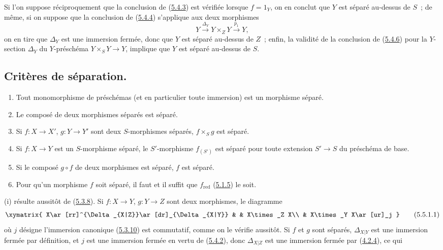 \begin{remark}[5.4.8]
\label{I.5.4.8-fr}
Si l'on suppose réciproquement que la conclusion de
(\hyperref[I.5.4.3-fr]{5.4.3}) est vérifiée lorsque $f=1_Y$, on en conclut
que $Y$ est séparé au-dessus de $S$~; de même, si on suppose que la conclusion
de (\hyperref[I.5.4.4-fr]{5.4.4}) s'applique aux deux morphismes
\[
  Y\xrightarrow{\Delta_Y}Y\times_Z Y\xrightarrow{p_1}Y,
\]
on en tire que $\Delta_Y$ est une immersion fermée, donc que $Y$ est séparé
au-dessus de $Z$~; enfin, la validité de la conclusion de
(\hyperref[I.5.4.6-fr]{5.4.6}) pour la $Y$-section $\Delta_Y$ du
$Y$-préschéma $Y\times_S Y\to Y$, implique que $Y$ est séparé au-dessus de
$S$.
\end{remark}

\subsection{Critères de séparation.}
\label{subsection:I.5.5-fr}

\begin{proposition}[5.5.1]
\label{I.5.5.1-fr}
\begin{enumerate}
  \item[\rm(i)] Tout monomorphisme de préschémas (et en particulier toute
    immersion) est un morphisme séparé.
  \item[\rm(ii)] Le composé de deux morphismes séparés est séparé.
  \item[\rm(iii)] Si $f:X\to X'$, $g:Y\to Y'$ sont deux $S$-morphismes
    séparés, $f\times_S g$ est séparé.
  \item[\rm(iv)] Si $f:X\to Y$ est un $S$-morphisme séparé, le
    $S'$-morphisme $f_{(S')}$ est séparé pour toute extension $S'\to S$ du
    préschéma de base.
  \item[\rm(v)] Si le composé $g\circ f$ de deux morphismes est séparé, $f$
    est séparé.
  \item[\rm(vi)] Pour qu'un morphisme $f$ soit séparé, il faut et il suffit
    que $f_{\mathrm{red}}$ (\hyperref[I.5.1.5-fr]{5.1.5}) le soit.
\end{enumerate}
\end{proposition}

(i) résulte aussitôt de (\hyperref[I.5.3.8-fr]{5.3.8}). Si $f:X\to Y$,
$g:Y\to Z$ sont deux morphismes, le diagramme
\[
  \xymatrix{
    X\ar[rr]^{\Delta_{X|Z}}\ar[dr]_{\Delta_{X|Y}} & &
    X\times_Z X\\
    & X\times_Y X\ar[ur]_j
  }
  \tag{5.5.1.1}\label{I.5.5.1.1-fr}
\]
où $j$ désigne l'immersion canonique (\hyperref[I.5.3.10-fr]{5.3.10}) est
commutatif, comme on le vérifie aussitôt. Si $f$ et $g$ sont séparés,
$\Delta_{X|Y}$ est une immersion fermée par définition, et $j$ est une
immersion fermée en vertu de (\hyperref[I.5.4.2-fr]{5.4.2}), donc
$\Delta_{X|Z}$ est une immersion fermée par
(\hyperref[I.4.2.4-fr]{4.2.4}), ce qui

